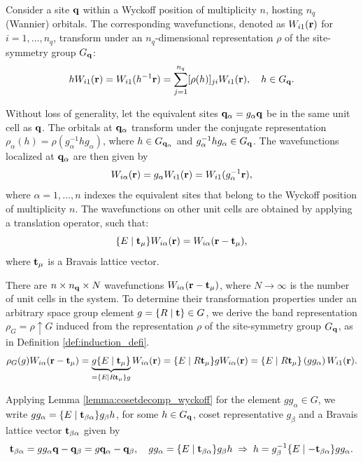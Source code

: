 Consider a site \({\vb{q}}\) within a Wyckoff position of multiplicity \(n\), hosting \(n_q\) (Wannier) orbitals. The corresponding wavefunctions, denoted as \(W_{i1}({\vb{r}})\) for \(i = 1, \ldots, n_q\), transform under an \(n_q\)-dimensional representation \(\rho\) of the site-symmetry group \(G_{\vb{q}}\):
\begin{equation} \label{eq:gWi1_nq_rep}
h W_{i1}({\vb{r}}) = W_{i1}(h^{-1} {\vb{r}}) = \sum_{j=1}^{n_q} [\rho(h)]_{ji} W_{i1}({\vb{r}}), \quad h \in G_{\vb{q}}.
\end{equation}

Without loss of generality, let the equivalent sites \({\vb{q}}_\alpha = g_{\alpha} {\vb{q}}\) be in the same unit cell as \({\vb{q}}\). The orbitals at \({\vb{q}}_\alpha\) transform under the conjugate representation \(\rho_\alpha(h) = \rho(g_\alpha^{-1} h g_\alpha)\), where \(h \in G_{{\vb{q}}_\alpha}\) and \(g_\alpha^{-1} h g_\alpha \in G_{\vb{q}}\). The wavefunctions localized at \({\vb{q}}_\alpha\) are then given by
\begin{equation} \label{eq:Wialpha_galpha_action}
W_{i\alpha}({\vb{r}}) = g_\alpha W_{i1}({\vb{r}}) = W_{i1}(g_\alpha^{-1} {\vb{r}}),
\end{equation}
where \(\alpha = 1, \ldots, n\) indexes the equivalent sites that belong to the Wyckoff position of multiplicity \(n\). The wavefunctions on other unit cells are obtained by applying a translation operator, such that:
\begin{equation} \label{eq:translated_Wialpha}
\{ E \mid {\vb{t}}_\mu \} W_{i\alpha}({\vb{r}}) = W_{i\alpha}({\vb{r}}-{\vb{t}}_\mu),
\end{equation}
where ${\vb{t}}_\mu$ is a Bravais lattice vector.

There are \(n \times n_{\vb{q}} \times N\) wavefunctions \(W_{i\alpha}({\vb{r}} - {\vb{t}}_\mu)\), where \(N \to \infty\) is the number of unit cells in the system. To determine their transformation properties under an arbitrary space group element \(g = \{ R \mid {\vb{t}} \} \in G\), we derive the band representation \(\rho_G = \rho \uparrow G\) induced from the representation \(\rho\) of the site-symmetry group \(G_{\vb{q}}\), as in Definition \ref{def:induction_defi}.
\begin{equation} \label{eq:induced_rho_G_wannier_step1}
\rho_G(g) W_{i\alpha}({\vb{r}}-{\vb{t}}_\mu) =
\underbrace{g \{ E \mid {\vb{t}}_\mu \}}_{= \{ E \mid R{\vb{t}}_\mu \} g} W_{i\alpha} ({\vb{r}}) =
\{ E \mid R{\vb{t}}_\mu \} g W_{i\alpha} ({\vb{r}}) =
\{ E \mid R{\vb{t}}_\mu \} \, (g g_\alpha) \, W_{i1} ({\vb{r}}).
\end{equation}

Applying Lemma \ref{lemma:cosetdecomp_wyckoff} for the element $g g_\alpha \in G$, we write $g g_\alpha = \{ E \mid {\vb{t}}_{\beta\alpha} \} g_\beta h$, for some $h \in G_{\vb{q}}$, coset representative $g_\beta$ and a Bravais lattice vector ${\vb{t}}_{\beta\alpha}$ given by
\begin{equation} \label{eq:t_betaalpha}
{\vb{t}}_{\beta\alpha} = gg_\alpha {\vb{q}} - {\vb{q}}_\beta = g {\vb{q}}_\alpha - {\vb{q}}_\beta, \quad
g g_\alpha = \{ E \mid {\vb{t}}_{\beta\alpha} \} g_\beta h \; \Rightarrow \; h = g_\beta^{-1} \{E\mid -{\vb{t}}_{\beta\alpha}\} g g_\alpha.
\end{equation}

